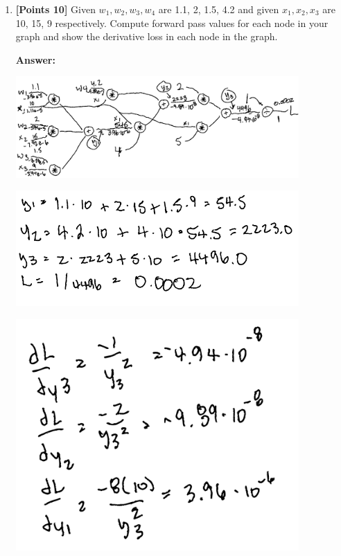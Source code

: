 \documentclass[12pt]{article}
\begin{document}
\begin{enumerate}
\begin{enumerate}
                    \newpage
              \item \textbf{[Points 10]} Given $w_1, w_2, w_3, w_4$ are 1.1, 2,
                    1.5, 4.2 and given $x_1, x_2, x_3$ are 10, 15, 9
                    respectively. Compute forward pass values for each node in
                    your graph and show the derivative loss in each node in the
                    graph.

                    \textbf{Answer:}

                    \includegraphics[width=0.85\textwidth]{assets/test1/compgraph3.png}

                    \includegraphics[width=0.85\textwidth]{assets/test1/bcalc1.png}

                    \includegraphics[width=0.85\textwidth]{assets/test1/bcalc2.png}


\end{enumerate}
\end{enumerate}
\end{document}
